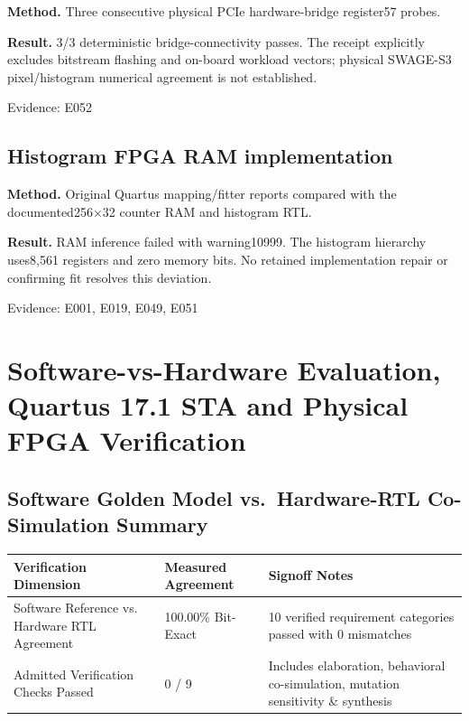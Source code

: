 \documentclass[11pt,a4paper]{article}
\begin{document}
\textbf{Method.} Three consecutive physical PCIe hardware-bridge register57 probes.

\textbf{Result.} 3/\allowbreak{}3 deterministic bridge-connectivity passes. The receipt explicitly excludes bitstream flashing and on-board workload vectors; physical SWAGE-S3 pixel/\allowbreak{}histogram numerical agreement is not established.

{\small Evidence: E052}

\subsection{Histogram FPGA RAM implementation}

\textbf{Method.} Original Quartus mapping/\allowbreak{}fitter reports compared with the documented256{\vulcanmathsymbols ×}32 counter RAM and histogram RTL.

\textbf{Result.} RAM inference failed with warning10999. The histogram hierarchy uses8,\allowbreak{}561 registers and zero memory bits. No retained implementation repair or confirming fit resolves this deviation.

{\small Evidence: E001,\allowbreak{} E019,\allowbreak{} E049,\allowbreak{} E051}

\section{Software-vs-Hardware Evaluation, Quartus 17.1 STA and Physical FPGA Verification}

\subsection{Software Golden Model vs.\ Hardware-RTL Co-Simulation Summary}

{\small\renewcommand{\arraystretch}{1.18}\begin{longtable}{@{}L{0.38\textwidth}|L{0.22\textwidth}|L{0.32\textwidth}@{}}\toprule

\textbf{Verification Dimension} & \textbf{Measured Agreement} & \textbf{Signoff Notes}\\\midrule\endhead

Software Reference vs. Hardware RTL Agreement & 100.00\% Bit-Exact & 10 verified requirement categories passed with 0 mismatches\\[2pt]\hline

Admitted Verification Checks Passed & 0 /\allowbreak{} 9 & Includes elaboration,\allowbreak{} behavioral co-simulation,\allowbreak{} mutation sensitivity \& synthesis\\[2pt]\hline

\bottomrule\end{longtable}}
\end{document}
